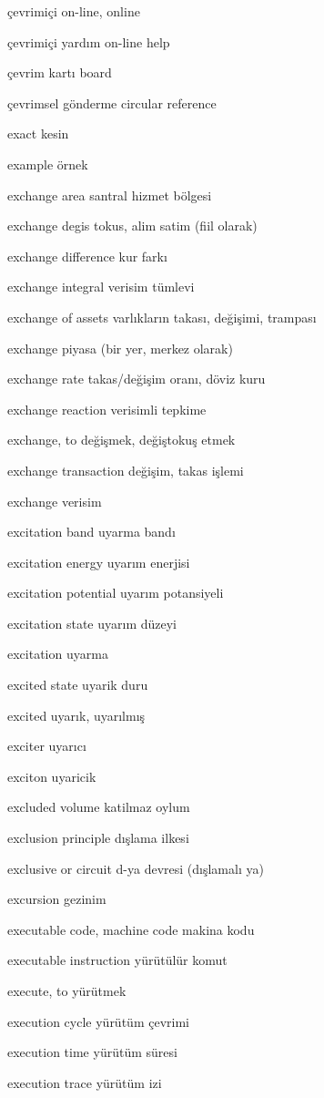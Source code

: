 \documentclass[12pt,fleqn]{article}\usepackage{../../common}
\begin{document}
çevrimiçi on-line, online

çevrimiçi yardım on-line help

çevrim kartı board

çevrimsel gönderme circular reference

exact kesin

example örnek

exchange area santral hizmet bölgesi

exchange degis tokus, alim satim (fiil olarak)

exchange difference kur farkı

exchange integral verisim tümlevi

exchange of assets varlıkların takası, değişimi, trampası

exchange piyasa (bir yer, merkez olarak)

exchange rate takas/değişim oranı, döviz kuru

exchange reaction verisimli tepkime

exchange, to değişmek, değiştokuş etmek

exchange transaction değişim, takas işlemi

exchange verisim

excitation band uyarma bandı

excitation energy uyarım enerjisi

excitation potential uyarım potansiyeli

excitation state uyarım düzeyi

excitation uyarma

excited state uyarik duru

excited uyarık, uyarılmış

exciter uyarıcı

exciton uyaricik

excluded volume katilmaz oylum

exclusion principle dışlama ilkesi

exclusive or circuit d-ya devresi (dışlamalı ya)

excursion gezinim

executable code, machine code makina kodu

executable instruction yürütülür komut

execute, to yürütmek

execution cycle yürütüm çevrimi

execution time yürütüm süresi

execution trace yürütüm izi
\end{document}
